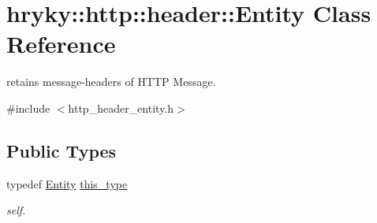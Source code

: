\hypertarget{classhryky_1_1http_1_1header_1_1_entity}{\section{hryky\-:\-:http\-:\-:header\-:\-:Entity Class Reference}
\label{classhryky_1_1http_1_1header_1_1_entity}
}


retains message-\/headers of H\-T\-T\-P Message.  




{\ttfamily \#include $<$http\-\_\-header\-\_\-entity.\-h$>$}

\subsection*{Public Types}
\begin{DoxyCompactItemize}
\item 
\hypertarget{classhryky_1_1http_1_1header_1_1_entity_a2d6b33008fa9a1607970c743ee7ee545}{typedef \hyperlink{classhryky_1_1http_1_1header_1_1_entity}{Entity} \hyperlink{classhryky_1_1http_1_1header_1_1_entity_a2d6b33008fa9a1607970c743ee7ee545}{this\-\_\-type}}\label{classhryky_1_1http_1_1header_1_1_entity_a2d6b33008fa9a1607970c743ee7ee545}

\begin{DoxyCompactList}\small\item\em self. \end{DoxyCompactList}\end{DoxyCompactItemize}
